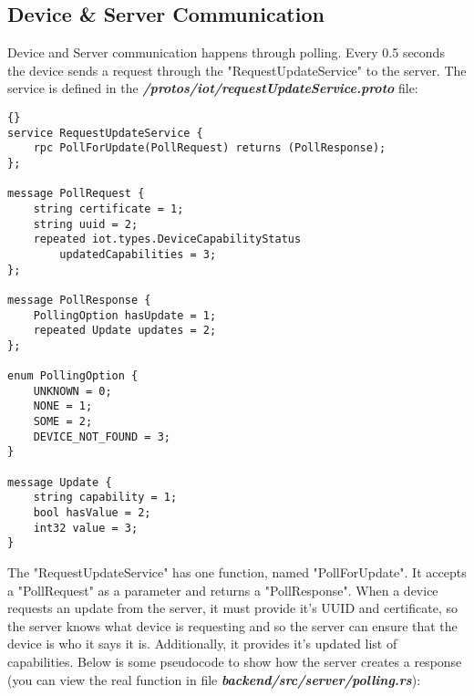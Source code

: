 \subsection{Device \& Server Communication}
Device and Server communication happens through polling. Every 0.5 seconds the device sends a request through the "RequestUpdateService" to the server. The service is defined in the \textit{\textbf{/protos/iot/requestUpdateService.proto}} file:
\begin{lstlisting}[language=protobuf3, style=boxed, showstringspaces=false]{}
service RequestUpdateService {
    rpc PollForUpdate(PollRequest) returns (PollResponse);
};

message PollRequest {
    string certificate = 1;
    string uuid = 2;
    repeated iot.types.DeviceCapabilityStatus 
        updatedCapabilities = 3;
};

message PollResponse {
    PollingOption hasUpdate = 1;
    repeated Update updates = 2;
};

enum PollingOption {
    UNKNOWN = 0;
    NONE = 1;
    SOME = 2;
    DEVICE_NOT_FOUND = 3;
}

message Update {
    string capability = 1;
    bool hasValue = 2;
    int32 value = 3;
}
\end{lstlisting}
The "RequestUpdateService" has one function, named "PollForUpdate". It accepts a "PollRequest" as a parameter and returns a "PollResponse". When a device requests an update from the server, it must provide it's UUID and certificate, so the server knows what device is requesting and so the server can ensure that the device is who it says it is. Additionally, it provides it's updated list of capabilities. Below is some pseudocode to show how the server creates a response (you can view the real function in file \textit{\textbf{backend/src/server/polling.rs}}): 

